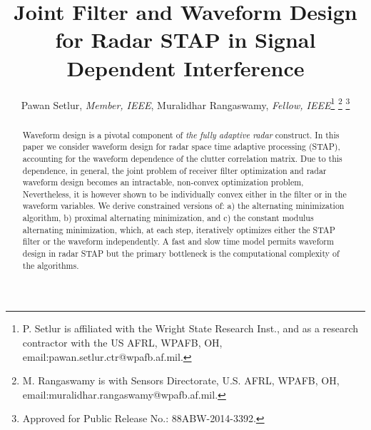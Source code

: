 \documentclass[11pt,draftclsnofoot,onecolumn]{IEEEtran}
\theoremstyle{definition}
\theoremstyle{remark}
\begin{document}
\title{Joint Filter and Waveform Design for Radar STAP in Signal Dependent Interference}








\author{Pawan Setlur, \emph{Member, IEEE}, Muralidhar Rangaswamy, \emph{Fellow, IEEE}\thanks{P. Setlur is affiliated with the Wright State Research Inst., and as a research contractor with the US AFRL, WPAFB, OH, email:pawan.setlur.ctr@wpafb.af.mil.}
\thanks{M. Rangaswamy is with Sensors Directorate, U.S. AFRL, WPAFB, OH,
email:muralidhar.rangaswamy@wpafb.af.mil.} 
\thanks{{Approved for Public Release No.: 88ABW-2014-3392}.} }
















\newcommand{\nrd}[1]{\textcolor{red}{#1}}
\newcommand{\pas}[1]{\textcolor{magenta}{#1}}
\newcommand{\nbl}[1]{\textcolor{blue}{#1}}



\maketitle


\begin{abstract}
Waveform design is a pivotal component of {\it the fully adaptive radar} construct. In this paper we consider  waveform design for radar space time adaptive processing (STAP), accounting for the waveform dependence of the clutter correlation matrix. Due to this dependence,  in general, the joint problem of receiver filter optimization and radar waveform design becomes an intractable, non-convex optimization problem, Nevertheless, it is however shown to be individually convex either in the filter or in the waveform variables. We derive constrained versions of: a) the alternating minimization algorithm, b) proximal alternating minimization, and c) the constant modulus  alternating minimization, which, at each step, iteratively optimizes either the STAP filter or the waveform independently. A fast and slow time model permits waveform design in radar STAP but the primary bottleneck is the computational complexity of the algorithms.


\end{abstract}
\end{document}
